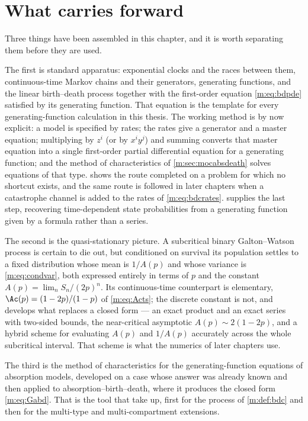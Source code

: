 \section{What carries forward}
\label{m:sec:summary}

Three things have been assembled in this chapter, and it is worth separating them
before they are used.

The first is standard apparatus: exponential clocks and the races between them,
continuous-time Markov chains and their generators, generating functions, and the
linear birth--death process together with the first-order equation
\cref{m:eq:bdpde} satisfied by its generating function. That equation is the
template for every generating-function calculation in this thesis. The working
method is by now explicit: a model is specified by rates; the rates give a
generator and a master equation; multiplying by $z^i$ (or by $x^iy^j$) and summing
converts that master equation into a single first-order partial differential
equation for a generating function; and the method of characteristics of
\cref{m:sec:mocabsdeath} solves equations of that type.  shows the
route completed on a problem for which no shortcut exists, and the same route is
followed in later chapters when a catastrophe channel is added to the rates of
\cref{m:eq:bdcrates}.  supplies the last step, recovering
time-dependent state probabilities from a generating function given by a formula
rather than a series.

The second is the quasi-stationary picture. A subcritical binary Galton--Watson
process is certain to die out, but conditioned on survival its population settles
to a fixed distribution whose mean is $1/A(p)$ and whose variance is
\cref{m:eq:condvar}, both expressed entirely in terms of $p$ and the constant
$A(p) = \lim_n S_n/(2p)^n$. Its continuous-time counterpart is elementary,
$\Ac(p) = (1-2p)/(1-p)$ of \cref{m:eq:Acts}; the discrete constant is not, and
\ChA{} develops what replaces a closed form --- an exact product and an exact
series with two-sided bounds, the near-critical asymptotic $A(p)\sim2(1-2p)$, and a
hybrid scheme for evaluating $A(p)$ and $1/A(p)$ accurately across the whole
subcritical interval. That scheme is what the numerics of later chapters use.

The third is the method of characteristics for the generating-function equations of
absorption models, developed on a case whose answer was already known and then
applied to absorption--birth--death, where it produces the closed form
\cref{m:eq:Gabd}. That is the tool that  take up, first for the process of
\cref{m:def:bdc} and then for the multi-type and multi-compartment extensions.

